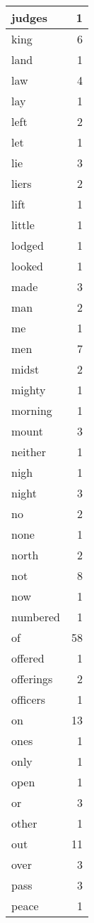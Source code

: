\begin{center}
\begin{longtable}{l|r}
judges & 1\\ \hline 
king & 6\\ \hline 
land & 1\\ \hline 
law & 4\\ \hline 
lay & 1\\ \hline 
left & 2\\ \hline 
let & 1\\ \hline 
lie & 3\\ \hline 
liers & 2\\ \hline 
lift & 1\\ \hline 
little & 1\\ \hline 
lodged & 1\\ \hline 
looked & 1\\ \hline 
made & 3\\ \hline 
man & 2\\ \hline 
me & 1\\ \hline 
men & 7\\ \hline 
midst & 2\\ \hline 
mighty & 1\\ \hline 
morning & 1\\ \hline 
mount & 3\\ \hline 
neither & 1\\ \hline 
nigh & 1\\ \hline 
night & 3\\ \hline 
no & 2\\ \hline 
none & 1\\ \hline 
north & 2\\ \hline 
not & 8\\ \hline 
now & 1\\ \hline 
numbered & 1\\ \hline 
of & 58\\ \hline 
offered & 1\\ \hline 
offerings & 2\\ \hline 
officers & 1\\ \hline 
on & 13\\ \hline 
ones & 1\\ \hline 
only & 1\\ \hline 
open & 1\\ \hline 
or & 3\\ \hline 
other & 1\\ \hline 
out & 11\\ \hline 
over & 3\\ \hline 
pass & 3\\ \hline 
peace & 1\\ \hline 

\end{longtable}
\end{center}
